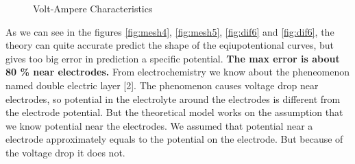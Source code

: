 \documentclass{article}
\begin{document}
\begin{figure}[htb!]
\begin{center}
\begin{minipage}[h]{0.47\linewidth}
\end{minipage}
\hfill
\begin{minipage}[h]{0.47\linewidth}
\end{minipage}

\end{center}
\caption{Volt-Ampere Characteristics}
\label{fig:mesh6}
\end{figure}


As we can see in the figures \ref{fig:mesh4}, \ref{fig:mesh5}, \ref{fig:dif6} and \ref{fig:dif6}, the theory can quite accurate predict the shape of the eqiupotentional curves, but gives too big error in prediction a specific potential. \textbf{The max error is about 80 \% near electrodes.} From electrochemistry we know about the pheneomenon named double electric layer [2]. The phenomenon causes voltage drop near electrodes, so potential in the electrolyte around the electrodes is different from the electrode potential. But the theoretical model works on the assumption that we know potential near the electrodes. We assumed that potential near a electrode approximately equals to the potential on the electrode. But because of the voltage drop it does not. \par
\end{document}
